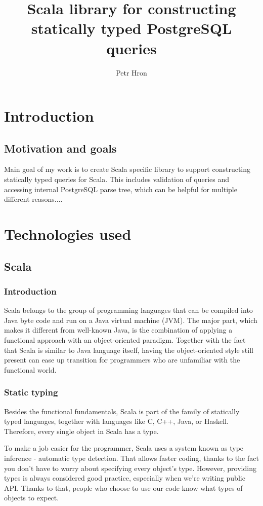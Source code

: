 \documentclass[thesis=B,english]{FITthesis}[2019/12/23]
\title{Scala library for constructing statically typed PostgreSQL queries}
\author{Petr Hron} %
\begin{document}

\chapter{Introduction}

\section{Motivation and goals}

Main goal of my work is to create Scala specific library to support constructing statically typed queries for Scala. This includes validation of queries and accessing internal PostgreSQL parse tree, which can be helpful for multiple different reasons....


\chapter{Technologies used}
\section{Scala}
\subsection{Introduction}
Scala belongs to the group of programming languages that can be compiled into Java byte code and run on a Java virtual machine (JVM). The major part, which makes it different from well-known Java, is the combination of applying a functional approach with an object-oriented paradigm. Together with the fact that Scala is similar to Java language itself, having the object-oriented style still present can ease up transition for programmers who are unfamiliar with the functional world.

\subsection{Static typing}

Besides the functional fundamentals, Scala is part of the family of statically typed languages, together with languages like C, C++, Java, or Haskell. Therefore, every single object in Scala has a type.

To make a job easier for the programmer, Scala uses a system known as type inference - automatic type detection. That allows faster coding, thanks to the fact you don’t have to worry about specifying every object’s type. However, providing types is always considered good practice, especially when we’re writing public API. Thanks to that, people who choose to use our code know what types of objects to expect. 
\end{document}
